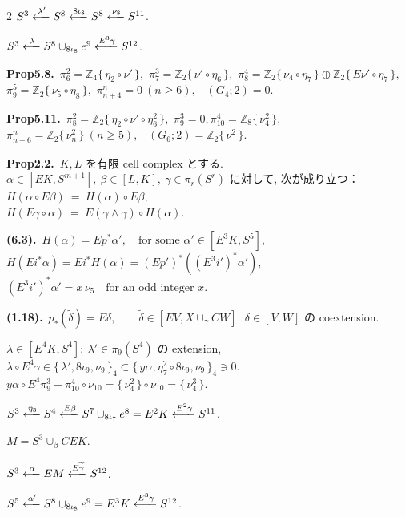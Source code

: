 \documentclass[10pt, leqno]{ltjsarticle}
\newcommand{\todai}[2][]{\{\,#2\,\}_{#1}}      %
\newcommand{\gen}[1]{\{\,#1\,\}}       %
\newcommand{\pis}[2]{\pi_{#1}(#2)}       %
\newcommand{\pit}[2]{\pi_{#1}^{#2}}
\numberwithin{equation}{section}
\theoremstyle{plain}
\theoremstyle{definition}
\theoremstyle{remark}
\begin{document}
\begin{paracol}{2}
\noindent
\(S^3\xlongleftarrow{\lambda'}
S^8\xlongleftarrow{8\iota_8}
S^8\xlongleftarrow{\nu_8}
S^{11}\).

\noindent
\(S^3\xlongleftarrow{\lambda}
S^8\cup_{8\iota_8} e^9\xlongleftarrow{E^3\gamma}
S^{12}\).

\noindent
\textbf{Prop5.8.}\
\(\pi^{2}_{6}=\mathbb Z_4\gen{\eta_{2}\circ\nu'},\) \quad
\(\pi^{3}_{7}=\mathbb Z_2\gen{\nu'\circ\eta_6},\) \quad
\(\pi^{4}_{8}=\mathbb Z_2\gen{\nu_{4}\circ\eta_7}\oplus \mathbb Z_2\gen{E\nu'\circ\eta_7},\) \\
\(\pi^{5}_{9}=\mathbb Z_2\gen{\nu_{5}\circ\eta_8},\) \quad
\(\pi^{n}_{n+4}=0\ (n\ge6),\) \
\((G_{4};2)=0.\)

\noindent
\textbf{Prop5.11.}\
\(\pi^{2}_{8}=\mathbb Z_2\gen{\eta_{2}\circ\nu'\circ\eta_6^2},\)\quad 
\(\pi^{3}_{9}=0,\)\quad \(\pi^{4}_{10}=\mathbb Z_8\gen{\nu_{4}^2},\) \\
\(\pi^{n}_{n+6}=\mathbb Z_2\gen{\nu_n^2}\ (n\ge5),\) \
\((G_{6};2)=\mathbb Z_2\gen{\nu^2}.\)

\noindent
\textbf{Prop2.2.}\
$K,L$ を有限 cell complex とする. \\
$\alpha\in[EK, S^{m+1}], \ \beta\in[L,K], \ \gamma\in\pi_r(S^r)$ 
に対して, 次が成り立つ：\\
\(
H(\alpha\circ E\beta)\ =\ H(\alpha)\circ E\beta,
\)\\
\(
H(E\gamma\circ\alpha)\ =\ E(\gamma\wedge\gamma)\circ H(\alpha).
\)

\noindent
\textbf{(6.3).}\
\(H(\alpha)=E p^{\ast}\alpha',  
\quad \text{for some } \alpha'\in [E^{3}K, S^{5}],\)\\
\(H(Ei^{\ast}\alpha) = Ei^{\ast}H(\alpha) = (Ep')^{\ast}((E^3i')^{\ast}\alpha'),\)\\
\((E^3 i')^{\ast}\alpha' = x\,\nu_{5}\quad \text{for an odd integer }x.\)

\noindent
\textbf{(1.18).}\
\(p_*(\widetilde{\delta}) = E\delta,\qquad
\widetilde{\delta}\in[EV, X\cup_\gamma CW]:\
\delta\in [V,W]\) の coextension.

\noindent
\(\lambda\in[E^4 K, S^4]:\ \lambda'\in\pis{9}{S^4}\) の extension,\\
\(\lambda\circ E^4\gamma\in \todai[4]{\lambda', 8\iota_9, \nu_9}
\subset \todai[4]{y\alpha, \eta_7^2\circ 8\iota_9, \nu_9}\ni 0\).\\
\(y\alpha\circ E^4\pit{9}{3} + \pit{10}{4}\circ \nu_{10}
= \gen{\nu_4^2}\circ \nu_{10} = \gen{\nu_4^3}\).

\noindent
\(S^3\xlongleftarrow{\eta_3}
S^4\xlongleftarrow{E\beta}
S^7\cup_{8\iota_7}e^8 = E^2 K\xlongleftarrow{E^2\gamma}
S^{11}\).

\noindent
\(M = S^3\cup_{\beta}CEK\).

\noindent
\(S^3\xlongleftarrow{\alpha}
EM \xlongleftarrow{E\widetilde{\gamma}}
S^{12}\).

\noindent
\(S^5\xlongleftarrow{\alpha'}
S^8\cup_{8\iota_8}e^9 = E^3 K \xlongleftarrow{E^3\gamma}
S^{12}\).




\end{paracol}
\end{document}
